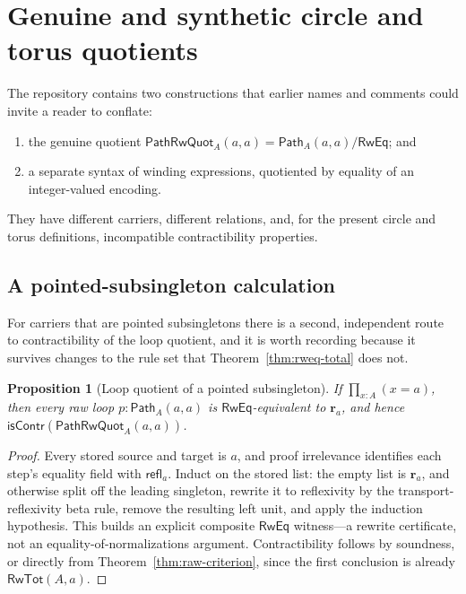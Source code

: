 \documentclass[10pt,reqno]{amsart}
\newtheorem{proposition}[theorem]{Proposition}
\newcommand{\isContr}{\mathsf{isContr}}
\newcommand{\RwTot}{\mathsf{RwTot}}
\newcommand{\PathTy}{\mathsf{Path}}
\newcommand{\refl}{\mathsf{refl}}
\newcommand{\PRW}{\mathsf{PathRwQuot}}
\begin{document}
\section{Genuine and synthetic circle and torus quotients}
\label{sec:genuine-synthetic}

The repository contains two constructions that earlier names and comments
could invite a reader to conflate:
\begin{enumerate}[label=(\alph*)]
\item the genuine quotient
  \(\PRW_A(a,a)=\PathTy_A(a,a)/\mathsf{RwEq}\); and
\item a separate syntax of winding expressions, quotiented by equality of an
  integer-valued encoding.
\end{enumerate}
They have different carriers, different relations, and, for the present circle
and torus definitions, incompatible contractibility properties.

\subsection{A pointed-subsingleton calculation}

For carriers that are pointed subsingletons there is a second, independent route
to contractibility of the loop quotient, and it is worth recording because it
survives changes to the rule set that Theorem~\ref{thm:rweq-total} does not.

\begin{proposition}[Loop quotient of a pointed subsingleton]
\label{prop:subsingleton-loop-quotient}
If \(\prod_{x:A}(x=a)\), then every raw loop \(p:\PathTy_A(a,a)\) is
\(\mathsf{RwEq}\)-equivalent to \(\mathbf r_a\), and hence
\(\isContr(\PRW_A(a,a))\).
\end{proposition}

\begin{proof}
Every stored source and target is \(a\), and proof irrelevance identifies each
step's equality field with \(\refl_a\).  Induct on the stored list: the empty
list is \(\mathbf r_a\), and otherwise split off the leading singleton, rewrite
it to reflexivity by the transport-reflexivity beta rule, remove the resulting
left unit, and apply the induction hypothesis.  This builds an explicit
composite \(\mathsf{RwEq}\) witness---a rewrite certificate, not an
equality-of-normalizations argument.  Contractibility follows by soundness, or
directly from Theorem~\ref{thm:raw-criterion}, since the first conclusion is
already \(\RwTot(A,a)\).
\end{proof}
\end{document}
